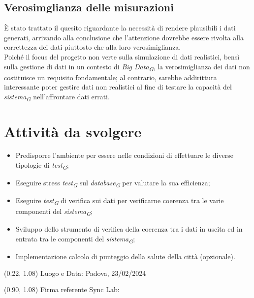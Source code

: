\documentclass{article}
\begin{document}
    \subsection{Verosimglianza delle misurazioni}
    È stato trattato il quesito riguardante la necessità di rendere plausibili i dati generati, arrivando alla conclusione che l'attenzione dovrebbe essere rivolta alla correttezza dei dati piuttosto che alla loro verosimiglianza.\\
    Poiché il focus del progetto non verte sulla simulazione di dati realistici, bensì sulla gestione di dati in un contesto di \textit{Big Data}\textsubscript{\textit{G}}, la verosimiglianza dei dati non costituisce un requisito fondamentale; al contrario, sarebbe addirittura interessante poter gestire dati non realistici al fine di testare la capacità del \textit{sistema}\textsubscript{\textit{G}} nell'affrontare dati errati.
\section{Attività da svolgere}
    \begin{itemize}
        \item Predisporre l'ambiente per essere nelle condizioni di effettuare le diverse tipologie di \textit{test}\textsubscript{\textit{G}};
        \item Eseguire stress \textit{test}\textsubscript{\textit{G}} sul \textit{database}\textsubscript{\textit{G}} per valutare la sua efficienza;
        \item Eseguire \textit{test}\textsubscript{\textit{G}} di verifica sui dati per verificarne coerenza tra le varie componenti del \textit{sistema}\textsubscript{\textit{G}};
        \item Sviluppo dello strumento di verifica della coerenza tra i dati in uscita ed in entrata tra le componenti del \textit{sistema}\textsubscript{\textit{G}};
        \item Implementazione calcolo di punteggio della salute della città (opzionale).
    \end{itemize}

\begin{textblock*}{\textwidth}(0.22\textwidth, 1.08\textheight)
    Luogo e Data: Padova, 23/02/2024
\end{textblock*}

\begin{textblock*}{\textwidth}(0.90\textwidth, 1.08\textheight)
        Firma referente Sync Lab:
\end{textblock*}
\end{document}
